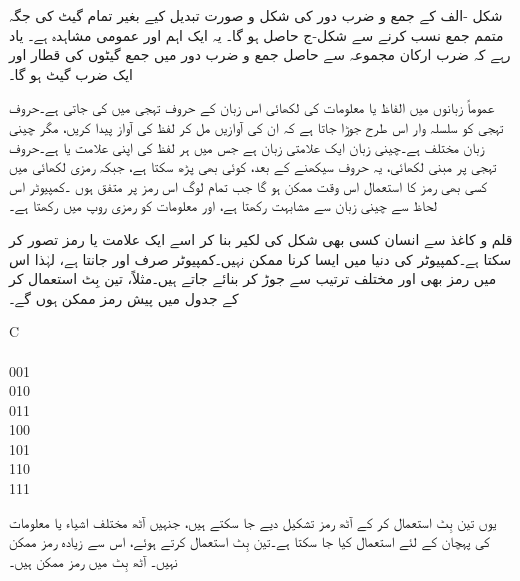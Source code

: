 شکل -الف کے جمع و ضرب دور کی شکل و صورت تبدیل کیے بغیر تمام گیٹ کی جگہ متمم جمع نسب کرنے سے شکل-ج حاصل ہو گا۔ یہ ایک اہم اور عمومی مشاہدہ ہے۔ یاد رہے کہ ضرب ارکان مجموعہ سے حاصل جمع و ضرب دور میں جمع گیٹوں کی قطار اور ایک ضرب گیٹ ہو گا۔



عموماً زبانوں میں الفاظ یا معلومات کی لکھائی اس زبان کے حروف تہجی میں کی جاتی ہے۔حروف تہجی کو سلسلہ وار اس طرح جوڑا جاتا ہے کہ ان کی آوازیں مل کر لفظ کی آواز پیدا کریں، مگر چینی زبان مختلف ہے۔چینی زبان ایک علامتی زبان ہے جس میں ہر لفظ کی اپنی علامت یا  ہے۔حروف تہجی پر مبنی لکھائی، یہ حروف سیکھنے کے بعد، کوئی بھی پڑھ سکتا ہے، جبکہ رمزی لکھائی میں کسی بھی رمز کا استعمال اس وقت ممکن ہو گا جب تمام لوگ اس رمز پر متفق ہوں ۔کمپیوٹر اس لحاظ سے چینی زبان سے مشابہت رکھتا ہے، اور معلومات کو رمزی روپ میں رکھتا ہے۔ 

قلم و کاغذ سے انسان کسی بھی شکل کی لکیر بنا کر اسے ایک علامت یا رمز تصور کر سکتا ہے۔کمپیوٹر کی دنیا میں ایسا کرنا ممکن نہیں۔کمپیوٹر صرف  اور  جانتا ہے، لہٰذا اس میں رمز بھی  اور  مختلف ترتیب سے جوڑ کر بنائے جاتے ہیں۔مثلاً، تین بِٹ استعمال کر کے جدول  میں پیش رمز ممکن ہوں گے۔
\begin{table}
\caption{تین بِٹ رمز۔}
\label{جدول_بوولین_تین_بٹ_رموز}
\centering
\begin{otherlanguage}{english}
\begin{tabular}{C}
\toprule
{}\\
\\
001\\
010\\
011\\
100\\
101\\
110\\
111\\
\bottomrule
\end{tabular}
\end{otherlanguage}
\end{table}
یوں تین بِٹ استعمال کر کے آٹھ رمز تشکیل دیے جا سکتے ہیں، جنہیں آٹھ مختلف اشیاء یا معلومات کی پہچان کے لئے استعمال کیا جا سکتا ہے۔تین بِٹ استعمال کرتے ہوئے، اس سے زیادہ رمز ممکن نہیں۔ آٹھ بِٹ میں  رمز ممکن ہیں۔

